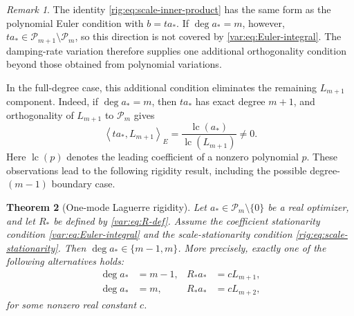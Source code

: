 \documentclass[11pt]{article}
\numberwithin{equation}{section}
\newtheorem{theorem}{Theorem}[section]
\theoremstyle{definition}
\theoremstyle{remark}
\newtheorem{remark}[theorem]{Remark}
\newcommand{\Pcal}{\mathcal P}
\newcommand{\Lag}{L}
\newcommand{\lc}{\operatorname{lc}}
\newcommand{\ip}[2]{\left\langle #1,#2\right\rangle_{E}}
\begin{document}
\begin{remark}\label{rig:rem:missing-direction}
The identity \eqref{rig:eq:scale-inner-product} has the same form as the polynomial Euler condition with $b=t a_*$. If $\deg a_*=m$, however, $t a_*\in\Pcal_{m+1}\setminus\Pcal_m$, so this direction is not covered by \eqref{var:eq:Euler-integral}. The damping-rate variation therefore supplies one additional orthogonality condition beyond those obtained from polynomial variations.
\end{remark}






In the full-degree case, this additional condition eliminates the remaining
$\Lag_{m+1}$ component. Indeed, if $\deg a_*=m$, then $t a_*$ has exact
degree $m+1$, and orthogonality of $\Lag_{m+1}$ to $\Pcal_m$ gives
$$
\ip{t a_*}{\Lag_{m+1}}
=
\frac{\lc(a_*)}{\lc(\Lag_{m+1})}
\neq 0.
$$
Here $\lc(p)$ denotes the leading coefficient of a nonzero polynomial $p$.
These observations lead to the following rigidity result, including the
possible degree-$(m-1)$ boundary case.


\begin{theorem}[One-mode Laguerre rigidity]\label{rig:thm:rigidity}
Let \(a_*\in\Pcal_m\setminus\{0\}\) be a real optimizer, and let \(R_*\) be defined by \eqref{var:eq:R-def}. Assume the coefficient stationarity condition \eqref{var:eq:Euler-integral} and the scale-stationarity condition \eqref{rig:eq:scale-stationarity}. Then $\deg a_*\in\{m-1,m\}$.
More precisely, exactly one of the following alternatives holds:
\begin{align}
    \deg a_*&=m-1,
    &R_*a_*&=c\Lag_{m+1},\label{rig:eq:lower-branch}\\
    \deg a_*&=m,
    &R_*a_*&=c\Lag_{m+2},\label{rig:eq:full-branch}
\end{align}
for some nonzero real constant \(c\).
\end{theorem}
\end{document}
